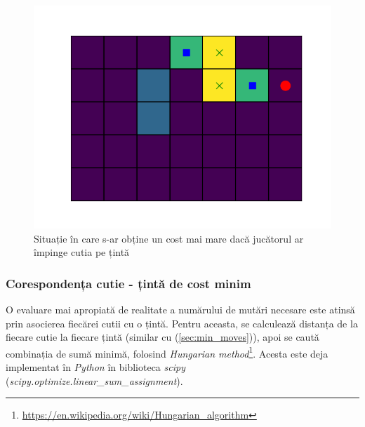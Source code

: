 \documentclass{article}
\begin{document}
\begin{figure}[ht]
    \begin{center}
        \includegraphics[scale=0.4]{scared.png}
    \end{center}
    \caption{Situație în care s-ar obține un cost mai mare dacă jucătorul ar 
    împinge cutia pe țintă}
    \label{fig:lee}
\end{figure}

\subsubsection{Corespondența cutie - țintă de cost minim}
O evaluare mai apropiată de realitate a numărului de mutări necesare este atinsă
prin asocierea fiecărei cutii cu o țintă. Pentru aceasta, se calculează distanța
de la fiecare cutie la fiecare țintă (similar cu (\ref{sec:min_moves})), apoi se
caută combinația de sumă minimă, folosind 
\textit{Hungarian method}\footnote{\url{https://en.wikipedia.org/wiki/Hungarian_algorithm}}. 
Acesta este deja implementat în \textit{Python} în biblioteca \textit{scipy} 
(\textit{scipy.optimize.linear\_sum\_assignment}).
\end{document}
